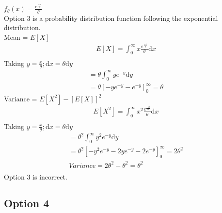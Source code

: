 \documentclass[12pt]{article}
\begin{document}
$f_{\theta}(x) = \frac{e^{\frac{-x}{\theta}}}{\theta}$ \\
Option 3 is a probability distribution function following the exponential distribution.\\
Mean = $E[X]$
\begin{align*}
    E[X] = \int_{0}^{\infty}{x}\frac{e^{\frac{-x}{\theta}}}{\theta}\mathrm{d}x \\
\end{align*}
Taking $y = \frac{x}{\theta}; \mathrm{d}x = \theta\mathrm{d}y$ 
\begin{align*}
    = \theta\int_{0}^{\infty}{y{e^{-y}}\mathrm{d}y} \\
    = \theta[-ye^{-y} -e^{-y}]_{0}^{\infty} = \theta
\end{align*}
Variance = $E[X^{2}] - [E[X]]^{2}$\\
\begin{align*}
    E[X^{2}] = \int_{0}^{\infty}{x^{2}}\frac{e^{\frac{-x}{\theta}}}{\theta}\mathrm{d}x \\
\end{align*}
Taking $y = \frac{x}{\theta}; \mathrm{d}x = \theta\mathrm{d}y$
\begin{align*}
    = \theta^{2}\int_{0}^{\infty}{y^{2}e^{-y}}\mathrm{d}y \\
    = \theta^{2}[-y^{2}e^{-y} -2ye^{-y} -2e^{-y}]_{0}^{\infty} = 2\theta^{2}\\
    Variance = 2\theta^{2} - {\theta}^{2} = \theta^{2}\\
\end{align*}
Option 3 is incorrect.
\subsection{Option 4}
\end{document}
